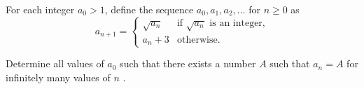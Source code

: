 For each integer 
$a_0  > 1$,
 define the sequence 
$a_0, a_1, a_2, \ldots$
 for 
$n \geq 0$
 as
$$a_{n+1} =
\begin{cases}
\sqrt{a_n} & \text{if } \sqrt{a_n} \text{ is an integer,} \\
a_n + 3 & \text{otherwise.}
\end{cases}
$$

Determine all values of 
$a_0$
 such that there exists a number 
$A$
 such that 
$a_n = A$
 for infinitely many values of 
$n$
.
